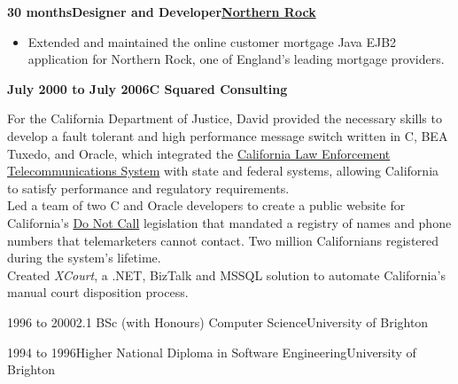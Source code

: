 \documentclass[a4paper,12pt]{article}
\newcommand{\head}[1]{\begin{center}{\large{\textbf{\sc{#1}}}}\nopagebreak\end{center}}
\newcommand{\jobheld}[2]{\textbf{#1\hfill #2}\nopagebreak}
\newcommand{\clientwork}[3]{\textbf{#1\hfill#3\hfill#2}\nopagebreak}
\newcommand{\tab}{\hspace{2em}}
\newcommand{\education}[3]{#1\tab#2\hfill#3}
\begin{document}
\clientwork{30 months}{\href{http://www.northernrock.co.uk}{Northern Rock}}{Designer and Developer}

\begin{itemize}

\item Extended and maintained the online customer mortgage Java EJB2 application for Northern Rock, one of England's leading mortgage providers.

\end{itemize}

\jobheld{July 2000 to July 2006}{C Squared Consulting}

For the California Department of Justice, David provided the necessary skills to develop a fault tolerant and high performance message switch written in C, BEA Tuxedo, and Oracle, which integrated the \href{http://definitions.uslegal.com/c/clets/}{California Law Enforcement Telecommunications System} with state and federal systems, allowing California to satisfy performance and regulatory requirements. \\

Led a team of two C and Oracle developers to create a public website for California's \href{http://www.sfgate.com/cgi-bin/article.cgi?f=/c/a/2003/03/31/MN5478.DTL}{Do Not Call} legislation that mandated a registry of names and phone numbers that telemarketers cannot contact.  Two million Californians registered during the system's lifetime. \\

Created \emph{XCourt}, a .NET, BizTalk and MSSQL solution to automate California's manual court disposition process.

\head{Education}

\education{1996 to 2000}{2.1 BSc (with Honours) Computer Science}{University of Brighton}

\education{1994 to 1996}{Higher National Diploma in Software Engineering}{University of Brighton}
\end{document}

